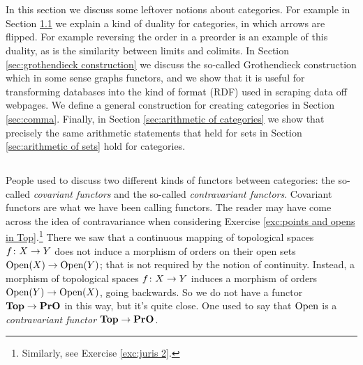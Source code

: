 \documentclass[CT4S-EN-RU]{subfiles}
\begin{document}
\section{}

\begin{blockENG}
In this section we discuss some leftover notions about categories. For example in Section \ref{sec:opposite} we explain a kind of duality for categories, in which arrows are flipped. For example reversing the order in a preorder is an example of this duality, as is the similarity between limits and colimits. In Section \ref{sec:grothendieck construction} we discuss the so-called Grothendieck construction which in some sense graphs functors, and we show that it is useful for transforming databases into the kind of format (RDF) used in scraping data off webpages. We define a general construction for creating categories in Section \ref{sec:comma}. Finally, in Section \ref{sec:arithmetic of categories} we show that precisely the same arithmetic statements that held for sets in Section \ref{sec:arithmetic of sets} hold for categories. 
\end{blockENG}

\begin{blockRUS}
\end{blockRUS}


\subsection{}\label{sec:opposite}

\begin{blockENG}
People used to discuss two different kinds of functors between categories: the so-called {\em covariant functors} and the so-called {\em contravariant functors}. Covariant functors are what we have been calling functors. The reader may have come across the idea of contravariance when considering Exercise \ref{exc:points and opens in Top}.\footnote{Similarly, see Exercise \ref{exc:juris 2}.} There we saw that a continuous mapping of topological spaces $f\colon X\rightarrow Y$ does not induce a morphism of orders on their open sets $\textnormal{Open}(X)\rightarrow\textnormal{Open}(Y)$; that is not required by the notion of continuity. Instead, a morphism of topological spaces $f\colon X\rightarrow Y$ induces a morphism of orders $\textnormal{Open}(Y)\rightarrow\textnormal{Open}(X)$, going backwards. So we do not have a functor ${\mathbf{Top}}\rightarrow{\mathbf{PrO}}$ in this way, but it's quite close. One used to say that $\textnormal{Open}$ is a {\em contravariant functor} ${\mathbf{Top}}\rightarrow{\mathbf{PrO}}$.
\end{blockENG}
\end{document}

